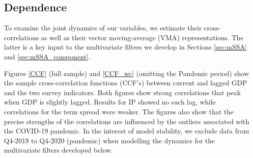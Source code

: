 \documentclass[11pt,a4paper]{article}
\begin{document}

\subsection{Dependence}
To examine the joint dynamics of our variables, we estimate their cross-correlations as well as their vector moving-average (VMA) representations. The latter is a key input to the multivariate filters we develop in Sections \ref{sec:mSSA} and \ref{sec:mSSA_component}. 

Figures \ref{CCF} (full sample) and \ref{CCF_wc} (omitting the Pandemic period) show the sample cross-correlation functions (CCF's) between current and lagged GDP and the two survey indicators. Both figures show strong correlations that peak when GDP is slightly lagged. Results for IP showed no such lag, while correlations for the term spread were weaker. The figures also show that the precise strengths of the correlations are influenced by the outliers associated with the COVID-19 pandemic. In the interest of model stability, we exclude data from Q4-2019 to Q4-2020 (pandemic) when modelling the dynamics for the multivariate filters developed below. 
\end{document}
